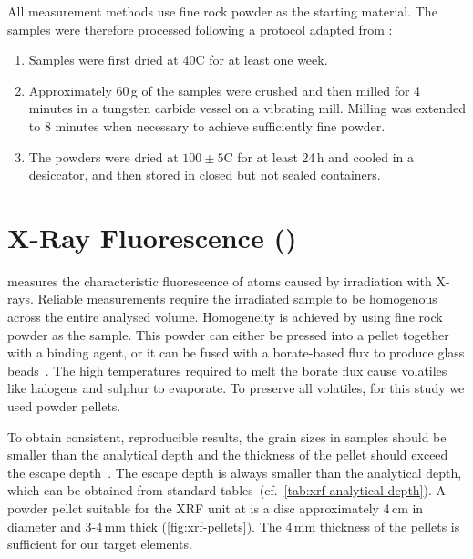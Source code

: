 All measurement methods use fine rock powder as the starting material. 
The samples were therefore processed following a protocol adapted from \textcite{ichikawa_solid_2023}:
\begin{enumerate}
    \item Samples were first dried at 40\degree C for at least one week.
    
    \item Approximately 60\,g of the samples were crushed and then milled for 4 minutes in a
    tungsten carbide vessel on a vibrating mill. 
    Milling was extended to 8 minutes when necessary to achieve sufficiently fine powder.
    
    \item The powders were dried at $100 \pm 5$\degree C for at least 24\,h and
    cooled in a desiccator, and then stored in closed but not sealed containers.
\end{enumerate}


\section{X-Ray Fluorescence (\XRF)}

\XRF measures the characteristic fluorescence of atoms caused by irradiation with X-rays.
Reliable measurements require the irradiated sample to be homogenous across
the entire analysed volume. Homogeneity is achieved by using
fine rock powder as the sample. This powder can either be pressed into a pellet
together with a binding agent, or it can be fused with a borate-based flux to
produce glass beads~\parencite{ichikawa_solid_2023}.
The high temperatures required to melt the borate flux cause volatiles like
halogens and sulphur to evaporate.
To preserve all volatiles, for this study we used powder pellets. 

To obtain consistent, reproducible results, the grain sizes in samples should be smaller than the analytical 
depth and the thickness of the pellet should exceed the escape depth~\parencite{ichikawa_solid_2023}.
The escape depth is always smaller than the analytical depth, which can be obtained from
standard tables~(cf.~\cref{tab:xrf-analytical-depth}).
A powder pellet suitable for the XRF unit at \ETH is a disc
approximately 4\,cm in diameter and 3-4\,mm thick (\cref{fig:xrf-pellets}). The 4\,mm thickness of the pellets
is sufficient for our target elements.


